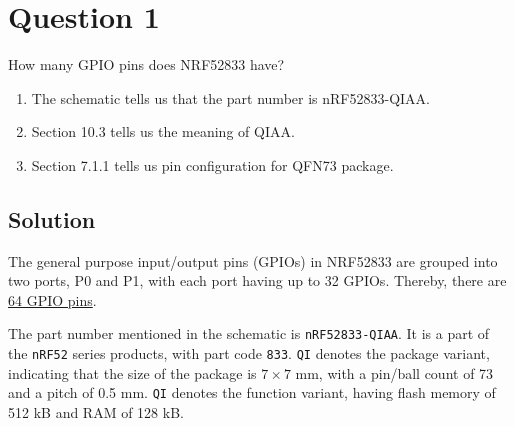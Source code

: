 \section*{Question 1}

How many GPIO pins does NRF52833 have?
\begin{enumerate}[label= (\alph*)]
    \item The schematic tells us that the part number is nRF52833-QIAA.\@
    \item Section 10.3 tells us the meaning of QIAA.\@
    \item Section 7.1.1 tells us pin configuration for QFN73 package.
\end{enumerate}

\subsection*{Solution}

The general purpose input/output pins (GPIOs) in NRF52833 are grouped into two ports, P0 and P1, with each port having up to 32 GPIOs.
Thereby, there are \underline{64 GPIO pins}.

The part number mentioned in the schematic is \texttt{nRF52833-QIAA}.
It is a part of the \texttt{nRF52} series products, with part code \texttt{833}.
\texttt{QI} denotes the package variant, indicating that the size of the package is \( 7\times 7 \) mm, with a pin/ball count of 73 and a pitch of 0.5 mm.
\texttt{QI} denotes the function variant, having flash memory of 512 kB and RAM of 128 kB.\@
